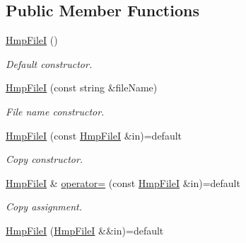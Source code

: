 \subsection*{Public Member Functions}
\begin{DoxyCompactItemize}
\item 
\mbox{\label{classvarfiles_1_1_hmp_file_i_a7e3d0800aaf51f663a3a1b3c94a70c49}} 
\hyperlink{classvarfiles_1_1_hmp_file_i_a7e3d0800aaf51f663a3a1b3c94a70c49}{Hmp\+FileI} ()
\begin{DoxyCompactList}\small\item\em Default constructor. \end{DoxyCompactList}\item 
\hyperlink{classvarfiles_1_1_hmp_file_i_a75a7a4a1ad6b2db183c17690c3f374ed}{Hmp\+FileI} (const string \&file\+Name)
\begin{DoxyCompactList}\small\item\em File name constructor. \end{DoxyCompactList}\item 
\mbox{\label{classvarfiles_1_1_hmp_file_i_a20cd71a7bb9d343a9c65dc5628ebb607}} 
\hyperlink{classvarfiles_1_1_hmp_file_i_a20cd71a7bb9d343a9c65dc5628ebb607}{Hmp\+FileI} (const \hyperlink{classvarfiles_1_1_hmp_file_i}{Hmp\+FileI} \&in)=default
\begin{DoxyCompactList}\small\item\em Copy constructor. \end{DoxyCompactList}\item 
\mbox{\label{classvarfiles_1_1_hmp_file_i_a9db94a90619674e8bc6330de98bbf55d}} 
\hyperlink{classvarfiles_1_1_hmp_file_i}{Hmp\+FileI} \& \hyperlink{classvarfiles_1_1_hmp_file_i_a9db94a90619674e8bc6330de98bbf55d}{operator=} (const \hyperlink{classvarfiles_1_1_hmp_file_i}{Hmp\+FileI} \&in)=default
\begin{DoxyCompactList}\small\item\em Copy assignment. \end{DoxyCompactList}\item 
\mbox{\label{classvarfiles_1_1_hmp_file_i_ab86e92886378c90dd250ad622f5e54d8}} 
\hyperlink{classvarfiles_1_1_hmp_file_i_ab86e92886378c90dd250ad622f5e54d8}{Hmp\+FileI} (\hyperlink{classvarfiles_1_1_hmp_file_i}{Hmp\+FileI} \&\&in)=default

\end{DoxyCompactItemize}

